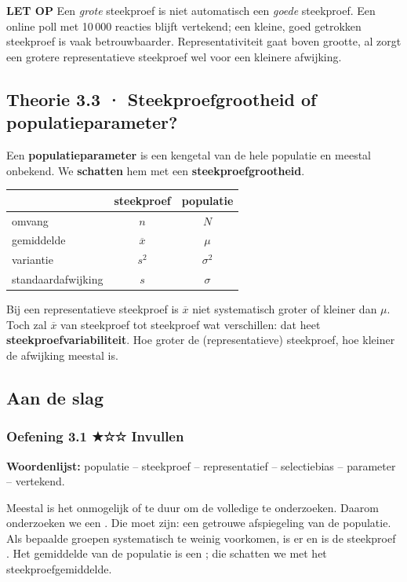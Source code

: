 \begin{letop}
\textbf{LET OP} \quad Een \emph{grote} steekproef is niet automatisch een \emph{goede} steekproef. Een online poll met 10\,000 reacties blijft vertekend; een kleine, goed getrokken steekproef is vaak betrouwbaarder. Representativiteit gaat boven grootte, al zorgt een grotere representatieve steekproef wel voor een kleinere afwijking.
\end{letop}

\subsection*{Theorie 3.3 · Steekproefgrootheid of populatieparameter?}

\begin{theorie}
Een \textbf{populatieparameter} is een kengetal van de hele populatie en meestal onbekend. We \textbf{schatten} hem met een \textbf{steekproefgrootheid}.

\begin{tabular}{lcc}
\hline
 & steekproef & populatie \\
\hline
omvang & $n$ & $N$ \\
gemiddelde & $\overline{x}$ & $\mu$ \\
variantie & $s^2$ & $\sigma^2$ \\
standaardafwijking & $s$ & $\sigma$ \\
\hline
\end{tabular}

Bij een representatieve steekproef is $\overline{x}$ niet systematisch groter of kleiner dan $\mu$. Toch zal $\overline{x}$ van steekproef tot steekproef wat verschillen: dat heet \textbf{steekproefvariabiliteit}. Hoe groter de (representatieve) steekproef, hoe kleiner de afwijking meestal is.
\end{theorie}

\subsection*{Aan de slag}

\subsubsection*{Oefening 3.1 \quad ★☆☆ \quad Invullen}

\textbf{Woordenlijst:} populatie – steekproef – representatief – selectiebias – parameter – vertekend.

Meestal is het onmogelijk of te duur om de volledige  te onderzoeken. Daarom onderzoeken we een . Die moet  zijn: een getrouwe afspiegeling van de populatie. Als bepaalde groepen systematisch te weinig voorkomen, is er  en is de steekproef . Het gemiddelde van de populatie is een ; die schatten we met het steekproefgemiddelde.


